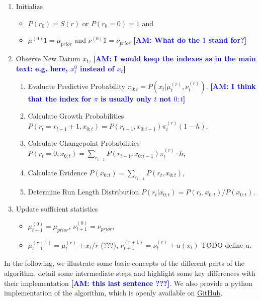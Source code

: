 \documentclass[12pt,english]{article}%
\newcommand{\AM}[1]{\textbf{\textcolor{blue}{[AM: #1]}}}
\begin{document}
\begin{enumerate}
	\item Initialize
	\begin{itemize}
		\item    $P(r_0)= S(r)$ or $P(r_0=0)=1$ and
		\item    $\mu^{(0)}1 = \mu_{prior}$ and $\nu^{(0)}1 = \nu_{prior}$
		\AM{What do the $1$ stand for?}
	\end{itemize}

	\item     Observe New Datum $x_t$,
	\AM{I would keep the indexes as in the main text: e.g. here, $x^{0}_t$ instead of $x_t$}

	\begin{enumerate}

		\item    Evaluate Predictive Probability $\pi_{0:t} = P(x_t |\mu^{(r)}_t,\nu^{(r)}_t)$.
		\AM{I think that the index for $\pi$ is usually only $t$ not $0:t$}
	    \item    Calculate Growth Probabilities $P(r_t=r_{t-1}+1, x_{0:t}) = P(r_{t-1}, x_{0:t-1}) \pi^{(r)}_t (1-h)$,
	    \item    Calculate Changepoint Probabilities $P(r_t=0, x_{0:t})= \sum_{r_{t-1}} P(r_{t-1}, x_{0:t-1}) \pi^{(r)}_t \cdot h$,
	    \item    Calculate Evidence $P(x_{0:t}) = \sum_{r_{t-1}} P (r_t, x_{0:t})$,
	    \item    Determine Run Length Distribution $P (r_t | x_{0:t}) = P (r_t, x_{0:t})/P (x_{0:t}) $.
	\end{enumerate}

	\item     Update sufficient statistics
		\begin{itemize}
			\item    $\mu^{(0)}_{t+1} = \mu_{prior}$, $\nu^{(0)}_{t+1} = \nu_{prior}$,
			\item    $\mu^{(r+1)}_{t+1} = \mu^{(r)}_{t} + x_t/r$ (???), $\nu^{(r+1)}_{t+1} = \nu^{(r)}_{t} + u(x_t)$ TODO define u.
		\end{itemize}
\end{enumerate}


In the following, we illustrate some basic concepts of the different parts of the algorithm, detail some intermediate steps and highlight some key differences with their implementation \AM{this last sentence ???}. We also provide a python implementation of the algorithm, which is openly available on \href{https://github.com/laurentperrinet/Bayesianchangepoint}{GitHub}.
\end{document}
